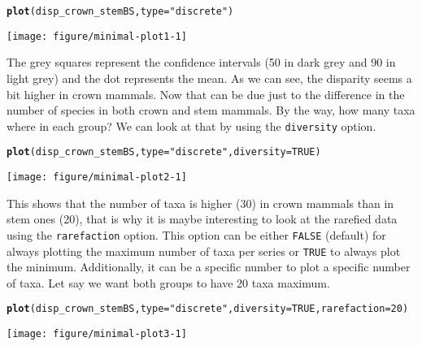 \documentclass{article}\usepackage[]{graphicx}\usepackage[]{color}
\makeatletter
\newcommand{\hlnum}[1]{\textcolor[rgb]{0.686,0.059,0.569}{#1}}%
\newcommand{\hlstr}[1]{\textcolor[rgb]{0.192,0.494,0.8}{#1}}%
\newcommand{\hlstd}[1]{\textcolor[rgb]{0.345,0.345,0.345}{#1}}%
\newcommand{\hlkwc}[1]{\textcolor[rgb]{0.333,0.667,0.333}{#1}}%
\newcommand{\hlkwd}[1]{\textcolor[rgb]{0.737,0.353,0.396}{\textbf{#1}}}%
\newenvironment{kframe}{%
 \def\at@end@of@kframe{}%
 \ifinner\ifhmode%
  \def\at@end@of@kframe{\end{minipage}}%
  \begin{minipage}{\columnwidth}%
 \fi\fi%
 \def\FrameCommand##1{\hskip\@totalleftmargin \hskip-\fboxsep
 \colorbox{shadecolor}{##1}\hskip-\fboxsep
     \hskip-\linewidth \hskip-\@totalleftmargin \hskip\columnwidth}%
 \MakeFramed {\advance\hsize-\width
   \@totalleftmargin\z@ \linewidth\hsize
   \@setminipage}}%
 {\par\unskip\endMakeFramed%
 \at@end@of@kframe}
\newenvironment{knitrout}{}{} %
\makeatother
\begin{document}
\begin{knitrout}
\color{fgcolor}\begin{kframe}
\begin{alltt}
\hlkwd{plot}\hlstd{(disp_crown_stemBS,} \hlkwc{type} \hlstd{=} \hlstr{"discrete"}\hlstd{)}
\end{alltt}
\end{kframe}

{\centering \texttt{[image: figure/minimal-plot1-1]} 

}



\end{knitrout}

The grey squares represent the confidence intervals (50 in dark grey and 90 in light grey) and the dot represents the mean. As we can see, the disparity seems a bit higher in crown mammals.
Now that can be due just to the difference in the number of species in both crown and stem mammals.
By the way, how many taxa where in each group? We can look at that by using the \texttt{diversity} option.

\begin{knitrout}
\color{fgcolor}\begin{kframe}
\begin{alltt}
\hlkwd{plot}\hlstd{(disp_crown_stemBS,} \hlkwc{type} \hlstd{=} \hlstr{"discrete"}\hlstd{,} \hlkwc{diversity} \hlstd{=} \hlnum{TRUE}\hlstd{)}
\end{alltt}
\end{kframe}

{\centering \texttt{[image: figure/minimal-plot2-1]} 

}



\end{knitrout}

This shows that the number of taxa is higher (30) in crown mammals than in stem ones (20), that is why it is maybe interesting to look at the rarefied data using the \texttt{rarefaction} option.
This option can be either \texttt{FALSE} (default) for always plotting the maximum number of taxa per series or \texttt{TRUE} to always plot the minimum.
Additionally, it can be a specific number to plot a specific number of taxa.
Let say we want both groups to have 20 taxa maximum.

\begin{knitrout}
\color{fgcolor}\begin{kframe}
\begin{alltt}
\hlkwd{plot}\hlstd{(disp_crown_stemBS,} \hlkwc{type} \hlstd{=} \hlstr{"discrete"}\hlstd{,} \hlkwc{diversity} \hlstd{=} \hlnum{TRUE}\hlstd{,} \hlkwc{rarefaction} \hlstd{=} \hlnum{20}\hlstd{)}
\end{alltt}
\end{kframe}

{\centering \texttt{[image: figure/minimal-plot3-1]} 

}



\end{knitrout}
\end{document}
